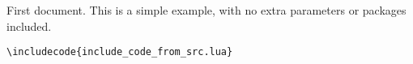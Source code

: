 \documentclass{article}
\begin{document}
First document. This is a simple example, with no 
extra parameters or packages included.

\begin{verbatim}
\includecode{include_code_from_src.lua}
\end{verbatim}
\end{document}
